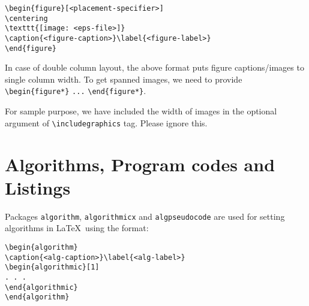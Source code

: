 \documentclass[sn-standardnature]{sn-jnl}%
\theoremstyle{thmstyleone}%
\theoremstyle{thmstyletwo}%
\theoremstyle{thmstylethree}%
\begin{document}
\bigskip
\begin{verbatim}
\begin{figure}[<placement-specifier>]
\centering
\texttt{[image: <eps-file>]}
\caption{<figure-caption>}\label{<figure-label>}
\end{figure}
\end{verbatim}
\bigskip



In case of double column layout, the above format puts figure captions/images to single column width. To get spanned images, we need to provide \verb+\begin{figure*}+ \verb+...+ \verb+\end{figure*}+.

For sample purpose, we have included the width of images in the optional argument of \verb+\includegraphics+ tag. Please ignore this.

\section{Algorithms, Program codes and Listings}\label{sec7}

Packages \verb+algorithm+, \verb+algorithmicx+ and \verb+algpseudocode+ are used for setting algorithms in \LaTeX\ using the format:

\bigskip
\begin{verbatim}
\begin{algorithm}
\caption{<alg-caption>}\label{<alg-label>}
\begin{algorithmic}[1]
. . .
\end{algorithmic}
\end{algorithm}
\end{verbatim}
\bigskip
\end{document}
